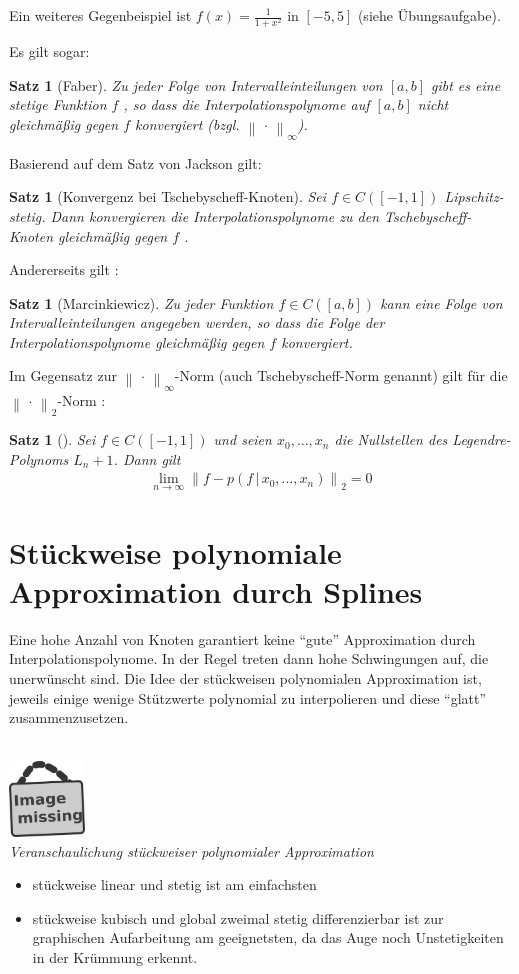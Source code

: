 \documentclass[ngerman,fontsize=11pt, paper=a4, parskip=half, titlepage=true, toc=bib]{scrbook}
\theoremstyle{definition}
\theoremstyle{plain}
\newtheorem{Satz}[Def]{Satz}		%
\newcommand{\nn}[1]{\left\| #1 \right\|}	%
\newcommand{\sectione}[1]{ \setcounter{equation}{0}\section{#1}}
\newenvironment{Satze}[1][]{ %
  \begin{Satz}[#1]  }
  { \end{Satz}
  	\addtocounter{subsection}{1}}
\newcommand{\imagemissing}[1]{
  \begin{center}~\\
    \centering 
    \includegraphics[width=2cm]{images/image_missing.jpg}\\
    \textit{#1} \\
  \end{center}
}
\begin{document}
Ein weiteres Gegenbeispiel ist $f(x)=\frac{1}{1+x^2}$ in $[-5,5]$ 
(siehe Übungsaufgabe).

Es gilt sogar:

\begin{Satze}[Faber]
	Zu jeder Folge von Intervalleinteilungen von $[a,b]$
	gibt es eine stetige Funktion $f$ ,
	so dass die Interpolationspolynome auf $[a, b]$
	nicht gleichmäßig gegen $f$ konvergiert 
	(bzgl. $\nn{\,\cdot\,}_\infty$).
\end{Satze}

Basierend auf dem Satz von Jackson gilt:
\begin{Satze}[Konvergenz bei Tschebyscheff-Knoten]
	Sei $f\in C([-1,1])$ Lipschitz-stetig.
	Dann konvergieren die Interpolationspolynome
	zu den Tschebyscheff-Knoten gleichmäßig	gegen $f$ .
\end{Satze}

Andererseits gilt \cite[siehe][]{haemmerlinhoffmann}:
\begin{Satze}[Marcinkiewicz]
	Zu jeder Funktion $f\in C([a,b])$ kann eine Folge von
	Intervalleinteilungen angegeben werden,
	so dass die Folge der Interpolationspolynome gleichmäßig gegen $f$ konvergiert.
\end{Satze}

Im Gegensatz zur $\nn{\,\cdot\,}_\infty$-Norm (auch Tschebyscheff-Norm genannt)
gilt für die $\nn{\,\cdot\,}_2$-Norm \cite[siehe][]{haemmerlinhoffmann}:
\begin{Satze}
	Sei $f\in C([-1,1])$ und seien $x_0,\dots, x_n$ die Nullstellen
	des	Legendre-Polynoms $L_n+1$. Dann gilt
	\begin{gather*}
		\lim\limits_{n\rightarrow \infty}\nn{f-p(f\,|\,x_0,\dots, x_n)}_2 = 0
	\end{gather*}
\end{Satze}


\sectione{Stückweise polynomiale Approximation durch Splines}
Eine hohe Anzahl von Knoten garantiert keine \enquote{gute}
Approximation durch Interpolationspolynome.
In der Regel treten dann hohe Schwingungen auf,
die unerwünscht sind.
Die Idee der stückweisen polynomialen Approximation ist,
jeweils einige wenige Stützwerte polynomial zu interpolieren
und diese \enquote{glatt} zusammenzusetzen.
\imagemissing{Veranschaulichung stückweiser polynomialer Approximation}
\begin{itemize}
  \item stückweise linear und stetig ist am einfachsten
  \item stückweise kubisch und global zweimal stetig differenzierbar
    ist zur graphischen Aufarbeitung am geeignetsten,
    da das Auge noch Unstetigkeiten in der Krümmung erkennt.
\end{itemize}
\end{document}
